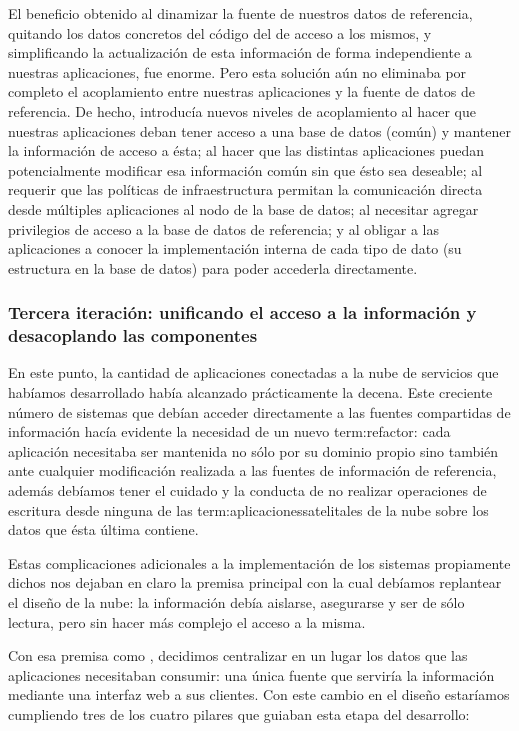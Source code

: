 El beneficio obtenido al dinamizar la fuente de nuestros datos de referencia, quitando los datos concretos del código del  de acceso a los mismos, y simplificando la actualización de esta información de forma independiente a nuestras aplicaciones, fue enorme. Pero esta solución aún no eliminaba por completo el acoplamiento entre nuestras aplicaciones y la fuente de datos de referencia. De hecho, introducía nuevos niveles de acoplamiento al hacer que nuestras aplicaciones deban tener acceso a una base de datos (común) y mantener la información de acceso a ésta; al hacer que las distintas aplicaciones puedan potencialmente modificar esa información común sin que ésto sea deseable; al requerir que las políticas de infraestructura permitan la comunicación directa desde múltiples aplicaciones al nodo de la base de datos; al necesitar agregar privilegios de acceso a la base de datos de referencia; y al obligar a las aplicaciones a conocer la implementación interna de cada tipo de dato (su estructura en la base de datos) para poder accederla directamente.


\subsubsection{Tercera iteración: unificando el acceso a la información y desacoplando las componentes}
\label{nube:etapa3}

En este punto, la cantidad de aplicaciones conectadas a la nube de servicios que habíamos desarrollado había alcanzado prácticamente la decena. Este creciente número de sistemas que debían acceder directamente a las fuentes compartidas de información hacía evidente la necesidad de un nuevo \gls{term:refactor}: cada aplicación necesitaba ser mantenida no sólo por su dominio propio sino también ante cualquier modificación realizada a las fuentes de información de referencia, además debíamos tener el cuidado y la conducta de no realizar operaciones de escritura desde ninguna de las \gls{term:aplicacionessatelitales} de la nube sobre los datos que ésta última contiene.

Estas complicaciones adicionales a la implementación de los sistemas propiamente dichos nos dejaban en claro la premisa principal con la cual debíamos replantear el diseño de la nube: la información debía aislarse, asegurarse y ser de sólo lectura, pero sin hacer más complejo el acceso a la misma.

Con esa premisa como , decidimos centralizar en un lugar los datos que las aplicaciones necesitaban consumir: una única fuente que serviría la información mediante una interfaz web a sus clientes. Con este cambio en el diseño estaríamos cumpliendo tres de los cuatro pilares que guiaban esta etapa del desarrollo:

